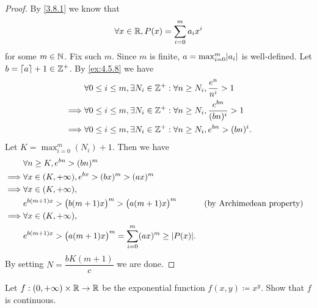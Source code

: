 \begin{proof}
  By \cref{3.8.1} we know that
  \[
    \forall x \in \mathbb{R}, P(x) = \sum_{i = 0}^m a_i x^i
  \]
  for some \(m \in \mathbb{N}\).
  Fix such \(m\).
  Since \(m\) is finite, \(a = \max_{i = 0}^m \abs{a_i}\) is well-defined.
  Let \(b = \left\lceil a\right\rceil + 1 \in \mathbb{Z}^+\).
  By \cref{ex:4.5.8} we have
  \begin{align*}
             & \forall 0 \leq i \leq m, \exists N_i \in \mathbb{Z}^+ : \forall n \geq N_i, \dfrac{e^n}{n^i} > 1       \\
    \implies & \forall 0 \leq i \leq m, \exists N_i \in \mathbb{Z}^+ : \forall n \geq N_i, \dfrac{e^{bn}}{(bn)^i} > 1 \\
    \implies & \forall 0 \leq i \leq m, \exists N_i \in \mathbb{Z}^+ : \forall n \geq N_i, e^{bn} > (bn)^i.
  \end{align*}
  Let \(K = \max_{i = 0}^m(N_i) + 1\).
  Then we have
  \begin{align*}
             & \forall n \geq K, e^{bn} > (bn)^m                                                                                        \\
    \implies & \forall x \in (K, +\infty), e^{bx} > (bx)^m > (ax)^m                                                                     \\
    \implies & \forall x \in (K, +\infty),                                                                                              \\
             & e^{b (m + 1) x} > \big(b (m + 1) x\big)^m > \big(a (m + 1) x\big)^m                &  & \text{(by Archimedean property)} \\
    \implies & \forall x \in (K, +\infty),                                                                                              \\
             & e^{b (m + 1) x} > \big(a (m + 1) x\big)^m = \sum_{i = 0}^m (ax)^m \geq \abs{P(x)}.
  \end{align*}
  By setting \(N = \dfrac{b K (m + 1)}{c}\) we are done.
\end{proof}

\begin{ex}\label{ex:4.5.10}
  Let \(f : (0, +\infty) \times \mathbb{R} \to \mathbb{R}\) be the exponential function \(f(x, y) \coloneqq x^y\).
  Show that \(f\) is continuous.
\end{ex}

